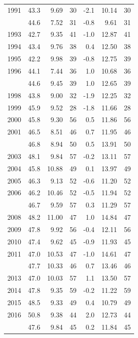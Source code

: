 \documentclass[print]{nuthesis}
\begin{document}
\begin{longtable}{rrrrrrr}
1991 & 43.3 & 9.69 & 30 & -2.1 & 10.14 & 30\\
\addlinespace
1992 & 44.6 & 7.52 & 31 & -0.8 & 9.61 & 31\\
1993 & 42.7 & 9.35 & 41 & -1.0 & 12.87 & 41\\
1994 & 43.4 & 9.76 & 38 & 0.4 & 12.50 & 38\\
1995 & 42.2 & 9.98 & 39 & -0.8 & 12.75 & 39\\
1996 & 44.1 & 7.44 & 36 & 1.0 & 10.68 & 36\\
\addlinespace
1997 & 44.6 & 9.45 & 39 & 1.0 & 12.65 & 39\\
1998 & 43.8 & 9.00 & 32 & -1.9 & 12.25 & 32\\
1999 & 45.9 & 9.52 & 28 & -1.8 & 11.66 & 28\\
2000 & 45.8 & 9.30 & 56 & 0.5 & 11.86 & 56\\
2001 & 46.5 & 8.51 & 46 & 0.7 & 11.95 & 46\\
\addlinespace
2002 & 46.8 & 8.94 & 50 & 0.5 & 13.91 & 50\\
2003 & 48.1 & 9.84 & 57 & -0.2 & 13.11 & 57\\
2004 & 45.8 & 10.88 & 49 & 0.1 & 13.97 & 49\\
2005 & 46.3 & 9.13 & 52 & -0.6 & 11.20 & 52\\
2006 & 46.2 & 10.46 & 52 & -0.5 & 11.94 & 52\\
\addlinespace
2007 & 46.7 & 9.59 & 57 & 0.3 & 11.29 & 57\\
2008 & 48.2 & 11.00 & 47 & 1.0 & 14.84 & 47\\
2009 & 47.8 & 9.92 & 56 & -0.4 & 12.11 & 56\\
2010 & 47.4 & 9.62 & 45 & -0.9 & 11.93 & 45\\
2011 & 47.0 & 10.53 & 47 & -1.0 & 14.61 & 47\\
\addlinespace
2012 & 47.7 & 10.33 & 46 & 0.7 & 13.46 & 46\\
2013 & 47.0 & 10.03 & 57 & 1.1 & 13.50 & 57\\
2014 & 47.8 & 9.35 & 59 & -0.2 & 11.22 & 59\\
2015 & 48.5 & 9.33 & 49 & 0.4 & 10.79 & 49\\
2016 & 50.8 & 9.38 & 44 & 2.0 & 12.73 & 44\\
\addlinespace
2017 & 47.6 & 9.84 & 45 & 0.2 & 11.84 & 45\\
\bottomrule
\end{longtable}
\end{document}
